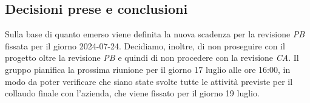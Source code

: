 \documentclass[italian,12pt]{article}
\begin{document}
\subsection{Decisioni prese e conclusioni}
Sulla base di quanto emerso viene definita la nuova scadenza per la revisione \textit{PB} fissata per il giorno 2024-07-24. Decidiamo, inoltre, di non proseguire con il progetto oltre la revisione \textit{PB} e quindi di non procedere con la revisione \textit{CA}. Il gruppo pianifica la prossima riunione per il giorno 17 luglio alle ore 16:00, in modo da poter verificare che siano state svolte tutte le attività previste per il collaudo finale con l'azienda, che viene fissato per il giorno 19 luglio.
\end{document}
